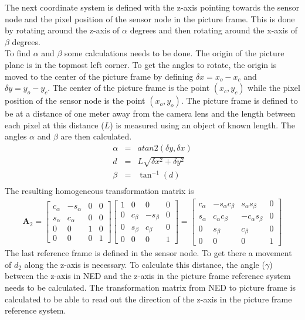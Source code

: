 The next coordinate system is defined with the z-axis pointing towards the sensor node and the pixel position of the sensor node in the picture frame. This is done by rotating around the z-axis of $\alpha$ degrees and then rotating around the x-axis of $\beta$ degrees.\\\newline
To find $\alpha$ and $\beta$ some calculations needs to be done. The origin of the picture plane is in the topmost left corner. To get the angles to rotate, the origin is moved to the center of the picture frame by defining $\delta x = x_o - x_c$ and $\delta y = y_o - y_c$. The center of the picture frame is the point $(x_c, y_c)$ while the pixel position of the sensor node is the point $(x_o, y_o)$. The picture frame is defined to be at a distance of one meter away from the camera lens and the length between each pixel at this distance ($L$) is measured using an object of known length. The angles $\alpha$ and $\beta$ are then calculated.
\begin{eqnarray}
\alpha &=& atan2(\delta y, \delta x)\\
d &=& L\sqrt{\delta x^2 + \delta y^2}\\
\beta &=& \tan ^{-1}(d)\\
\end{eqnarray}
The resulting homogeneous transformation matrix is
\begin{eqnarray}
\boldsymbol{A}_2 = \begin{bmatrix}
c_\alpha & -s_\alpha & 0 & 0\\
s_\alpha & c_\alpha  & 0 & 0\\
0		 & 0		 & 1 & 0\\
0 		 & 0		 & 0 & 1
\end{bmatrix}
\begin{bmatrix}
1 & 0 		& 0 	   & 0\\
0 & c_\beta & -s_\beta & 0\\
0 & s_\beta & c_\beta  & 0\\
0 & 0		& 0		   & 1
\end{bmatrix}
= \begin{bmatrix}
c_\alpha	& -s_\alpha c_\beta		& s_\alpha s_\beta 		& 0\\
s_\alpha	& c_\alpha c_\beta	 	& -c_\alpha s_\beta 	& 0\\
0			& s_\beta			 	& c_\beta 				& 0\\
0			& 0						& 0						& 1
\end{bmatrix}
\end{eqnarray}
The last reference frame is defined in the sensor node. To get there a movement of $d_2$ along the z-axis is necessary. To calculate this distance, the angle ($\gamma$) between the z-axis in NED and the z-axis in the picture frame reference system needs to be calculated. The transformation matrix from NED to picture frame is calculated to be able to read out the direction of the z-axis in the picture frame reference system.
